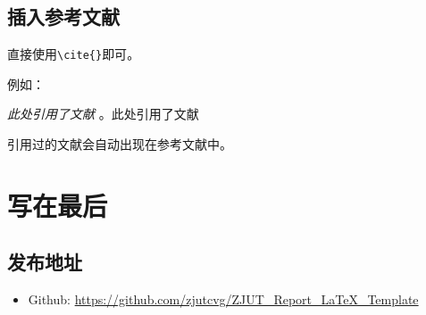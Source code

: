 \documentclass[12pt,hyperref,a4paper,UTF8]{ctexart}
\begin{document}
\subsection{插入参考文献}
直接使用\verb|\cite{}|即可\cite{DBLP:conf/nips/VaswaniSPUJGKP17}。

例如：


   \textit{ 此处引用了文献}
   \cite{DBLP:conf/nips/VaswaniSPUJGKP17}。此处引用了文献\cite{DBLP:conf/nips/VaswaniSPUJGKP17}


引用过的文献会自动出现在参考文献中。

\section{写在最后}
\subsection{发布地址}
\begin{itemize}
    \item Github: \url{https://github.com/zjutcvg/ZJUT_Report_LaTeX_Template}
\end{itemize}



\end{document}
